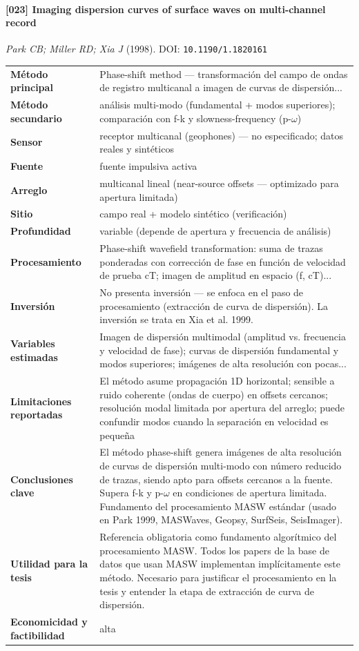 \paragraph{[023] Imaging dispersion curves of surface waves on multi-channel record} \emph{Park CB; Miller RD; Xia J} (1998).
{\scriptsize DOI: \texttt{10.1190/1.1820161}}

\begin{center}\scriptsize
\begin{tabularx}{\textwidth}{@{}>{\bfseries}p{3.3cm} X@{}}
\toprule
M\'etodo principal & Phase-shift method --- transformación del campo de ondas de registro multicanal a imagen de curvas de dispersión... \\
M\'etodo secundario & análisis multi-modo (fundamental + modos superiores); comparación con f-k y slowness-frequency (p-$\omega$) \\
Sensor & receptor multicanal (geophones) --- no especificado; datos reales y sintéticos \\
Fuente & fuente impulsiva activa \\
Arreglo & multicanal lineal (near-source offsets --- optimizado para apertura limitada) \\
Sitio & campo real + modelo sintético (verificación) \\
Profundidad & variable (depende de apertura y frecuencia de análisis) \\
Procesamiento & Phase-shift wavefield transformation: suma de trazas ponderadas con corrección de fase en función de velocidad de prueba cT; imagen de amplitud en espacio (f, cT)... \\
Inversi\'on & No presenta inversión --- se enfoca en el paso de procesamiento (extracción de curva de dispersión). La inversión se trata en Xia et al. 1999. \\
Variables estimadas & Imagen de dispersión multimodal (amplitud vs. frecuencia y velocidad de fase); curvas de dispersión fundamental y modos superiores; imágenes de alta resolución con pocas... \\
Limitaciones reportadas & El método asume propagación 1D horizontal; sensible a ruido coherente (ondas de cuerpo) en offsets cercanos; resolución modal limitada por apertura del arreglo; puede confundir modos cuando la separación en velocidad es pequeña \\
Conclusiones clave & El método phase-shift genera imágenes de alta resolución de curvas de dispersión multi-modo con número reducido de trazas, siendo apto para offsets cercanos a la fuente. Supera f-k y p-$\omega$ en condiciones de apertura limitada. Fundamento del procesamiento MASW estándar (usado en Park 1999, MASWaves, Geopsy, SurfSeis, SeisImager). \\
Utilidad para la tesis & Referencia obligatoria como fundamento algorítmico del procesamiento MASW. Todos los papers de la base de datos que usan MASW implementan implícitamente este método. Necesario para justificar el procesamiento en la tesis y entender la etapa de extracción de curva de dispersión. \\
Economicidad y factibilidad & alta \\
\bottomrule
\end{tabularx}
\end{center}


